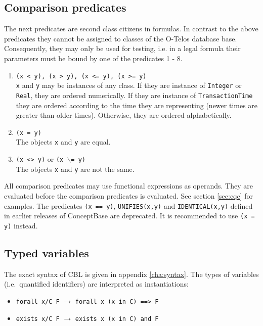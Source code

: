 \subsection{Comparison predicates}
The next predicates are second class citizens in formulas. In contrast to the
above predicates they cannot be assigned to classes of the O-Telos database
base. Consequently, they may only be used for testing, i.e. in a legal
formula their parameters must be bound by one of the predicates 1 - 8.

\begin{enumerate}
\item {\tt (x < y), (x > y), (x <= y), (x >= y)}\\
{\tt x} and {\tt y} may be instances of any class. If they are instance of {\tt Integer} or
{\tt Real}, they are ordered numerically. If they are instance of {\tt TransactionTime} they
are ordered according to the time they are representing (newer times are greater than older
times). Otherwise, they are ordered alphabetically.
\item {\tt (x = y)} \\
The objects {\tt x} and {\tt y} are equal. 
\item {\tt (x <> y)} or {\tt (x $\backslash$= y)}\\
The objects {\tt x} and {\tt y} are not the same. 
\end{enumerate}

All comparison predicates may use functional expressions as operands.
They are evaluated before the comparison predicates is evaluated. See
section \ref{sec:cqc} for examples.
The predicates {\tt (x == y)}, {\tt UNIFIES(x,y)} and {\tt IDENTICAL(x,y)} defined in earlier releases of ConceptBase are deprecated. It is recommended to use
{\tt (x = y)} instead.



\subsection{Typed variables}
The exact syntax of CBL is given in appendix \ref{cha:syntax}.
The types of variables
(i.e.\ quantified identifiers) are interpreted as instantiations:

\begin{itemize}
\item {\tt forall x/C F}  \hfill $\rightarrow$  \hfill {\tt forall x (x in C) ==> F} \hfill \hbox{}
\item {\tt exists x/C F}  \hfill $\rightarrow$  \hfill {\tt exists x (x in C) and F} \hfill \hbox{}
\end{itemize}


